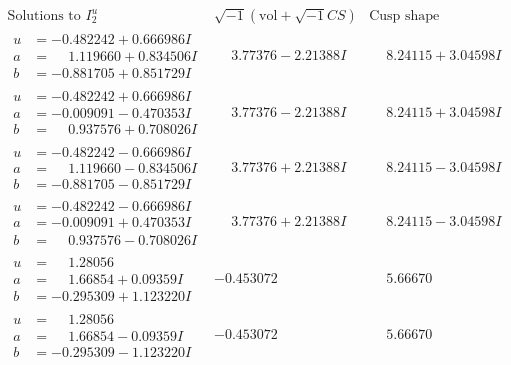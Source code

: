 \documentclass[1p]{elsarticle_modified}
\theoremstyle{definition}
\newcommand{\I}{\sqrt{-1}}
\begin{document}
$$\begin{array}{c|c|c}  
\text{Solutions to }I^u_{2}& \I (\text{vol} + \sqrt{-1}CS) & \text{Cusp shape}\\
 \hline 
\begin{aligned}
u &= -0.482242 + 0.666986 I \\
a &= \phantom{-}1.119660 + 0.834506 I \\
b &= -0.881705 + 0.851729 I\end{aligned}
 & \phantom{-}3.77376 - 2.21388 I & \phantom{-}8.24115 + 3.04598 I \\ \hline\begin{aligned}
u &= -0.482242 + 0.666986 I \\
a &= -0.009091 - 0.470353 I \\
b &= \phantom{-}0.937576 + 0.708026 I\end{aligned}
 & \phantom{-}3.77376 - 2.21388 I & \phantom{-}8.24115 + 3.04598 I \\ \hline\begin{aligned}
u &= -0.482242 - 0.666986 I \\
a &= \phantom{-}1.119660 - 0.834506 I \\
b &= -0.881705 - 0.851729 I\end{aligned}
 & \phantom{-}3.77376 + 2.21388 I & \phantom{-}8.24115 - 3.04598 I \\ \hline\begin{aligned}
u &= -0.482242 - 0.666986 I \\
a &= -0.009091 + 0.470353 I \\
b &= \phantom{-}0.937576 - 0.708026 I\end{aligned}
 & \phantom{-}3.77376 + 2.21388 I & \phantom{-}8.24115 - 3.04598 I \\ \hline\begin{aligned}
u &= \phantom{-}1.28056\phantom{ +0.000000I} \\
a &= \phantom{-}1.66854 + 0.09359 I \\
b &= -0.295309 + 1.123220 I\end{aligned}
 & -0.453072\phantom{ +0.000000I} & \phantom{-}5.66670\phantom{ +0.000000I} \\ \hline\begin{aligned}
u &= \phantom{-}1.28056\phantom{ +0.000000I} \\
a &= \phantom{-}1.66854 - 0.09359 I \\
b &= -0.295309 - 1.123220 I\end{aligned}
 & -0.453072\phantom{ +0.000000I} & \phantom{-}5.66670\phantom{ +0.000000I} \\ \hline\begin{aligned}

\end{aligned}
\end{array}$$
\end{document}

